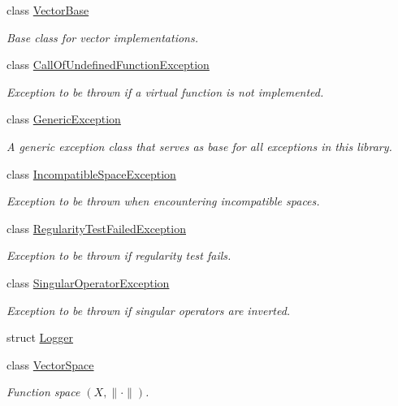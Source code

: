 \begin{DoxyCompactItemize}
\item 
class \hyperlink{classSpacy_1_1VectorBase}{\-Vector\-Base}
\begin{DoxyCompactList}\small\item\em \-Base class for vector implementations. \end{DoxyCompactList}\item 
class \hyperlink{classSpacy_1_1CallOfUndefinedFunctionException}{\-Call\-Of\-Undefined\-Function\-Exception}
\begin{DoxyCompactList}\small\item\em \-Exception to be thrown if a virtual function is not implemented. \end{DoxyCompactList}\item 
class \hyperlink{classSpacy_1_1GenericException}{\-Generic\-Exception}
\begin{DoxyCompactList}\small\item\em \-A generic exception class that serves as base for all exceptions in this library. \end{DoxyCompactList}\item 
class \hyperlink{classSpacy_1_1IncompatibleSpaceException}{\-Incompatible\-Space\-Exception}
\begin{DoxyCompactList}\small\item\em \-Exception to be thrown when encountering incompatible spaces. \end{DoxyCompactList}\item 
class \hyperlink{classSpacy_1_1RegularityTestFailedException}{\-Regularity\-Test\-Failed\-Exception}
\begin{DoxyCompactList}\small\item\em \-Exception to be thrown if regularity test fails. \end{DoxyCompactList}\item 
class \hyperlink{classSpacy_1_1SingularOperatorException}{\-Singular\-Operator\-Exception}
\begin{DoxyCompactList}\small\item\em \-Exception to be thrown if singular operators are inverted. \end{DoxyCompactList}\item 
struct \hyperlink{structSpacy_1_1Logger}{\-Logger}
\item 
class \hyperlink{classSpacy_1_1VectorSpace}{\-Vector\-Space}
\begin{DoxyCompactList}\small\item\em \-Function space $(X,\|\cdot\|)$. \end{DoxyCompactList}\end{DoxyCompactItemize}
